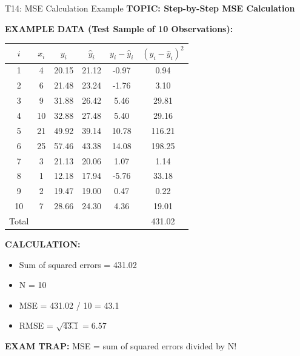 \documentclass[8pt]{beamer}
\begin{document}
	\begin{frame}{T14: MSE Calculation Example}
		\fontsize{6.5}{7.5}\selectfont
		\textbf{TOPIC: Step-by-Step MSE Calculation}
		
		\vspace{0.1cm}
		\textbf{EXAMPLE DATA (Test Sample of 10 Observations):}
		
		\begin{tabular}{|c|c|c|c|c|c|}
			\hline
			$i$ & $x_i$ & $y_i$ & $\hat{y}_i$ & $y_i - \hat{y}_i$ & $(y_i - \hat{y}_i)^2$ \\
			\hline
			1 & 4 & 20.15 & 21.12 & -0.97 & 0.94 \\
			2 & 6 & 21.48 & 23.24 & -1.76 & 3.10 \\
			3 & 9 & 31.88 & 26.42 & 5.46 & 29.81 \\
			4 & 10 & 32.88 & 27.48 & 5.40 & 29.16 \\
			5 & 21 & 49.92 & 39.14 & 10.78 & 116.21 \\
			6 & 25 & 57.46 & 43.38 & 14.08 & 198.25 \\
			7 & 3 & 21.13 & 20.06 & 1.07 & 1.14 \\
			8 & 1 & 12.18 & 17.94 & -5.76 & 33.18 \\
			9 & 2 & 19.47 & 19.00 & 0.47 & 0.22 \\
			10 & 7 & 28.66 & 24.30 & 4.36 & 19.01 \\
			\hline
			Total & & & & & 431.02 \\
			\hline
		\end{tabular}
		
		\vspace{0.1cm}
		\textbf{CALCULATION:}
		\begin{itemize}
			\item Sum of squared errors = 431.02
			\item N = 10
			\item MSE = 431.02 / 10 = 43.1
			\item RMSE = $\sqrt{43.1} = 6.57$
		\end{itemize}
		
		\textcolor{myred}{\textbf{EXAM TRAP:}} MSE = \textcolor{myblue}{sum of squared errors divided by N}!
	\end{frame}
	
\end{document}
